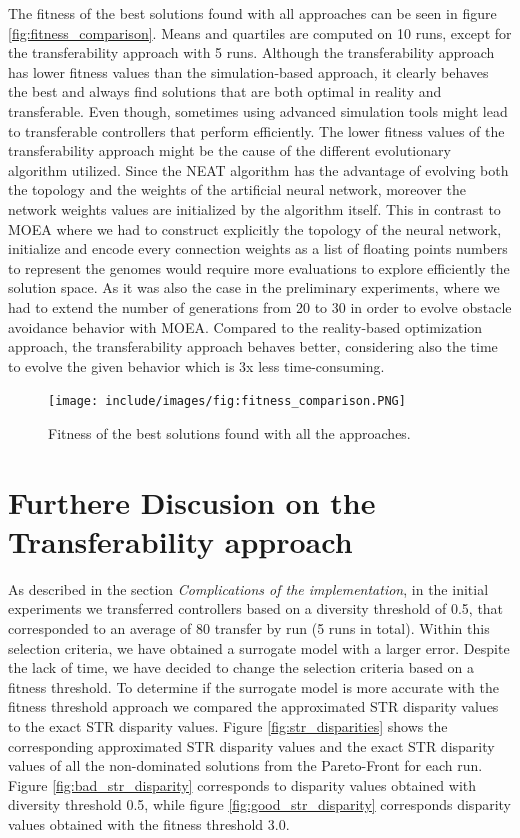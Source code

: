 The fitness of the best solutions found with all approaches can be seen in figure \ref{fig:fitness_comparison}. Means and quartiles are computed on 10 runs, except for the transferability approach with 5 runs. Although the transferability approach has lower fitness values than the simulation-based approach, it clearly behaves the best and always find solutions that are both optimal in reality and transferable. Even though, sometimes using advanced simulation tools might lead to transferable controllers that perform efficiently. The lower fitness values of the transferability approach might be the cause of the different evolutionary algorithm utilized. Since the NEAT algorithm has the advantage of evolving both the topology and the weights of the artificial neural network, moreover the network weights values are initialized by the algorithm itself. This in contrast to MOEA where we had to construct explicitly the topology of the neural network, initialize and encode every connection weights as a list of floating points numbers to represent the genomes would require more evaluations to explore efficiently the solution space. As it was also the case in the preliminary experiments, where we had to extend the number of generations from 20 to 30 in order to evolve obstacle avoidance behavior with MOEA. Compared to the reality-based optimization approach, the transferability approach behaves better, considering also the time to evolve the given behavior which is 3x less time-consuming.

\begin{figure}[H]
	\centering
  	\texttt{[image: include/images/fig:fitness\_comparison.PNG]}
  	\caption{Fitness of the best solutions found with all the approaches.}
  	\label{fig:best_pareto}
\end{figure}

\section{Furthere Discusion on the Transferability approach}

As described in the section \emph{Complications of the implementation}, in the initial experiments we transferred controllers based on a diversity threshold of 0.5, that corresponded to an average of 80 transfer by run (5 runs in total). Within this selection criteria, we have obtained a surrogate model with a larger error. Despite the lack of time, we have decided to change the selection criteria based on a fitness threshold. To determine if the surrogate model is more accurate with the fitness threshold approach we compared the approximated STR disparity values to the exact STR disparity values. Figure \ref{fig:str_disparities} shows the corresponding approximated STR disparity values and the exact STR disparity values of all the non-dominated solutions from the Pareto-Front for each run. Figure \ref{fig:bad_str_disparity} corresponds to disparity values obtained with diversity threshold 0.5, while figure \ref{fig:good_str_disparity} corresponds disparity values obtained with the fitness threshold 3.0.


